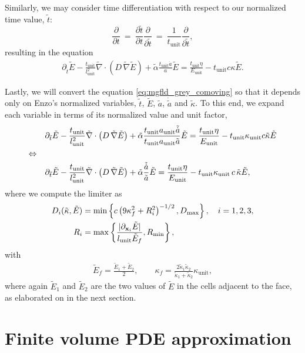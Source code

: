 \documentclass[10pt]{article}
\renewcommand{\(}{\left(}
\renewcommand{\)}{\right)}
\newcommand{\xvec}{{\bf x}}
\newcommand{\adot}{\dot{a}}
\newcommand{\Aunit}{a_{\text{unit}}}
\newcommand{\Lunit}{l_{\text{unit}}}
\newcommand{\Tunit}{t_{\text{unit}}}
\newcommand{\Eunit}{E_{\text{unit}}}
\newcommand{\Kunit}{\kappa_{\text{unit}}}
\newcommand{\tK}{\tilde{\kappa}}
\newcommand{\tT}{\tilde{t}}
\newcommand{\tE}{\tilde{E}}
\newcommand{\tA}{\tilde{a}}
\newcommand{\tAdot}{\tilde{\adot}}
\newcommand{\talpha}{\tilde{\alpha}}
\newcommand{\tnabla}{\tilde{\nabla}}
\begin{document}
Similarly, we may consider time differentiation with respect to our
normalized time value, $\tT$:
\[
   \frac{\partial}{\partial t} \ = \
   \frac{\partial \tT}{\partial t} \frac{\partial}{\partial \tT} \ = \
   \frac{1}{\Tunit}\frac{\partial}{\partial \tT},
\]
resulting in the equation
\begin{align}
  \label{eq:mgfld_grey_comoving_tnormalized}
  \partial_{\tT} \tE - \frac{\Tunit}{\Lunit^2}\tnabla\cdot\(D\,\tnabla \tE\)
    + \talpha\frac{\Tunit \adot}{a} \tE = \frac{\Tunit\eta}{\Eunit} -
    \Tunit c\kappa \tE.
\end{align}

Lastly, we will convert the equation \eqref{eq:mgfld_grey_comoving} so
that it depends only on Enzo's normalized variables, $\tT$, $\tE$,
$\tA$, $\dot{\tA}$ and $\tK$.  To this end, we expand each
variable in terms of its normalized value and unit factor, 
\begin{align}
  \notag
  &\partial_{\tT} \tE - \frac{\Tunit}{\Lunit^2}\tnabla\cdot\(D\,\tnabla \tE\)
    + \talpha\frac{\Tunit \Aunit\tAdot}{\Tunit \Aunit\tA} \tE = 
    \frac{\Tunit\eta}{\Eunit} - \Tunit \Kunit c \tK \tE \\
  \Leftrightarrow \quad & \\
  \label{eq:mgfld_grey_comoving_normalized}
  &\partial_{\tT} \tE - \frac{\Tunit}{\Lunit^2}\tnabla\cdot\(D\,\tnabla \tE\)
    + \talpha\frac{\tAdot}{\tA} \tE = 
    \frac{\Tunit\eta}{\Eunit} - \Tunit \Kunit\, c\, \tK \tE,
\end{align}
where we compute the limiter as
\begin{align}
  \label{eq:Morel_limiterD_normalized}
  D_i(\tK,\tE) &= \min\left\{ c \left(9\kappa_f^2 + R_i^2\right)^{-1/2},
    D_\text{max} \right\}, \quad i=1,2,3,\\
  \label{eq:Morel_limiterR_normalized}
  R_i &= \max\left\{ \frac{|\partial_{\xvec_i}\tE|}{\Lunit \tE_f}, R_\text{min} \right\},
\end{align}
with
\begin{align}
  \label{eq:face_values_normalized}
  \tE_f = \frac{\tE_1 + \tE_2}{2}, \qquad 
  \kappa_f = \frac{2\tK_1\tK_2}{\tK_1+\tK_2}\Kunit,
\end{align}
where again $\tE_1$ and $\tE_2$ are the two values of $\tE$ in the
cells adjacent to the face, as elaborated on in the next section. 






\section{Finite volume PDE approximation}
\label{sec:fv_approximation}
\end{document}
